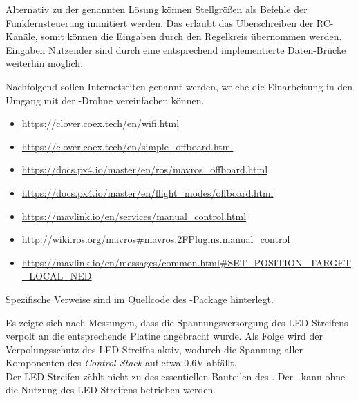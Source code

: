 Alternativ zu der genannten Lösung können Stellgrößen als Befehle der Funkfernsteuerung immitiert werden. Das  erlaubt das Überschreiben der RC-Kanäle, somit können die Eingaben durch den Regelkreis übernommen werden. Eingaben Nutzender sind durch eine entsprechend implementierte Daten-Brücke weiterhin möglich.


Nachfolgend sollen Internetseiten genannt werden, welche die Einarbeitung in den Umgang mit der \COEX-Drohne vereinfachen können.

\begin{itemize}
\item \href{https://clover.coex.tech/en/wifi.html}{https://clover.coex.tech/en/wifi.html}
\item \href{https://clover.coex.tech/en/simple\_offboard.html}{https://clover.coex.tech/en/simple\_offboard.html}
\item \href{https://docs.px4.io/master/en/ros/mavros\_offboard.html}{https://docs.px4.io/master/en/ros/mavros\_offboard.html}
\item \href{https://docs.px4.io/master/en/flight\_modes/offboard.html}{https://docs.px4.io/master/en/flight\_modes/offboard.html}
\item \href{https://mavlink.io/en/services/manual\_control.html}{https://mavlink.io/en/services/manual\_control.html}
\item \href{http://wiki.ros.org/mavros\#mavros.2FPlugins.manual\_control}{http://wiki.ros.org/mavros\#mavros.2FPlugins.manual\_control}
\item \href{https://mavlink.io/en/messages/common.html\#SET\_POSITION\_TARGET\_LOCAL\_NED}{https://mavlink.io/en/messages/common.html\#SET\_POSITION\_TARGET\_LOCAL\_NED}
\end{itemize}

Spezifische Verweise sind im Quellcode des \COEX-Package hinterlegt.



Es zeigte sich nach Messungen, dass die Spannungsversorgung des LED-Streifens verpolt an die entsprechende Platine angebracht wurde.
Als Folge wird der Verpolungsschutz des LED-Streifns aktiv, wodurch die Spannung aller Komponenten des \textit{Control Stack} auf etwa 0.6V abfällt.\\
Der LED-Streifen zählt nicht zu des essentiellen Bauteilen des \Quad. Der \Quad\ kann ohne die Nutzung des LED-Streifens betrieben werden.


